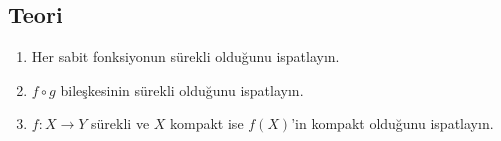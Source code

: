 \subsection*{Teori}

\begin{enumerate}[label=T\arabic*.]
\item Her sabit fonksiyonun sürekli olduğunu ispatlayın.
\item $f \circ g$ bileşkesinin sürekli olduğunu ispatlayın.
\item $f: X \to Y$ sürekli ve $X$ kompakt ise $f(X)$'in kompakt olduğunu
      ispatlayın. 
\end{enumerate}
